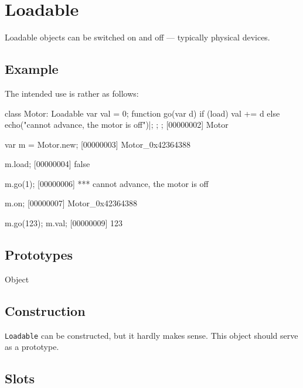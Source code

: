
\section{Loadable}

Loadable objects can be switched on and off --- typically physical
devices.

\subsection{Example}

The intended use is rather as follows:

\begin{urbiscript}
class Motor: Loadable
{
  var val = 0;
  function go(var d)
  {
    if (load)
      val += d
    else
      echo("cannot advance, the motor is off")|;
  };
};
[00000002] Motor

var m = Motor.new;
[00000003] Motor_0x42364388

m.load;
[00000004] false

m.go(1);
[00000006] *** cannot advance, the motor is off

m.on;
[00000007] Motor_0x42364388

m.go(123);
m.val;
[00000009] 123
\end{urbiscript}

\subsection{Prototypes}

\begin{refObjects}
\item[Object]
\end{refObjects}

\subsection{Construction}

\lstinline|Loadable| can be constructed, but it hardly makes sense.
This object should serve as a prototype.

\subsection{Slots}

